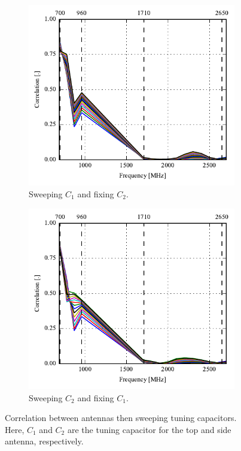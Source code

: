\begin{figure}[htbp]
    \centering
    \begin{subfigure}{0.49\linewidth}
        \includegraphics{img/tech_sol/trianglefeed/corr/correlation_Csh1-sweep}
        \caption{Sweeping $C_1$ and fixing $C_2$.}
    \end{subfigure}
    \hfill
    \begin{subfigure}{0.49\linewidth}
        \includegraphics{img/tech_sol/trianglefeed/corr/correlation_Csh2-sweep}
        \caption{Sweeping $C_2$ and fixing $C_1$.}
    \end{subfigure}
    \caption{Correlation between antennas then sweeping tuning capacitors. Here, $C_1$ and $C_2$ are the tuning capacitor for the top and side antenna, respectively.}
    \label{fig:corr_sol2}
\end{figure}
